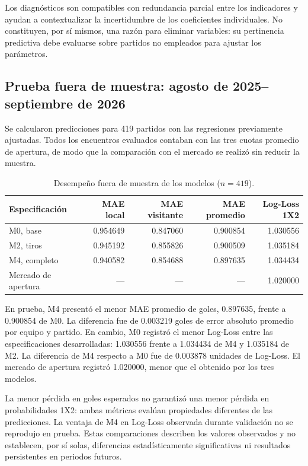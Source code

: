 \documentclass[11pt,a4paper]{article}
\begin{document}
Los diagnósticos son compatibles con redundancia parcial entre los indicadores y ayudan a contextualizar la incertidumbre de los coeficientes individuales. No constituyen, por sí mismos, una razón para eliminar variables: su pertinencia predictiva debe evaluarse sobre partidos no empleados para ajustar los parámetros.

\subsection{Prueba fuera de muestra: agosto de 2025--septiembre de 2026}
Se calcularon predicciones para 419 partidos con las regresiones previamente ajustadas. Todos los encuentros evaluados contaban con las tres cuotas promedio de apertura, de modo que la comparación con el mercado se realizó sin reducir la muestra.

\begin{table}[H]
\centering\small
\caption{Desempeño fuera de muestra de los modelos ($n=419$).}
\begin{tabular}{lrrrr}
\toprule
Especificación & MAE local & MAE visitante & MAE promedio & Log-Loss 1X2\\
\midrule
M0, base & 0.954649 & 0.847060 & 0.900854 & 1.030556\\
M2, tiros & 0.945192 & 0.855826 & 0.900509 & 1.035184\\
M4, completo & 0.940582 & 0.854688 & 0.897635 & 1.034434\\
Mercado de apertura & --- & --- & --- & 1.020000\\
\bottomrule
\end{tabular}
\end{table}

En prueba, M4 presentó el menor MAE promedio de goles, 0.897635, frente a 0.900854 de M0. La diferencia fue de 0.003219 goles de error absoluto promedio por equipo y partido. En cambio, M0 registró el menor Log-Loss entre las especificaciones desarrolladas: 1.030556 frente a 1.034434 de M4 y 1.035184 de M2. La diferencia de M4 respecto a M0 fue de 0.003878 unidades de Log-Loss. El mercado de apertura registró 1.020000, menor que el obtenido por los tres modelos.

La menor pérdida en goles esperados no garantizó una menor pérdida en probabilidades 1X2: ambas métricas evalúan propiedades diferentes de las predicciones. La ventaja de M4 en Log-Loss observada durante validación no se reprodujo en prueba. Estas comparaciones describen los valores observados y no establecen, por sí solas, diferencias estadísticamente significativas ni resultados persistentes en periodos futuros.
\end{document}
